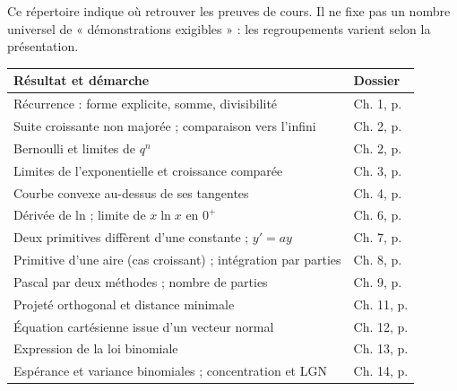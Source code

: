 Ce répertoire indique où retrouver les preuves de cours. Il ne fixe pas un nombre universel de « démonstrations exigibles » : les regroupements varient selon la présentation.
\begin{longtable}{@{}p{}p{}@{}}\toprule\textbf{Résultat et démarche}&\textbf{Dossier}\\\midrule\endhead
Récurrence : forme explicite, somme, divisibilité&Ch. 1, p. \pageref{ch:1}\\
Suite croissante non majorée ; comparaison vers l'infini&Ch. 2, p. \pageref{ch:2}\\
Bernoulli et limites de $q^n$&Ch. 2, p. \pageref{ch:2}\\
Limites de l'exponentielle et croissance comparée&Ch. 3, p. \pageref{ch:3}\\
Courbe convexe au-dessus de ses tangentes&Ch. 4, p. \pageref{ch:4}\\
Dérivée de ln ; limite de $x\ln x$ en $0^+$&Ch. 6, p. \pageref{ch:6}\\
Deux primitives diffèrent d'une constante ; $y'=ay$&Ch. 7, p. \pageref{ch:7}\\
Primitive d'une aire (cas croissant) ; intégration par parties&Ch. 8, p. \pageref{ch:8}\\
Pascal par deux méthodes ; nombre de parties&Ch. 9, p. \pageref{ch:9}\\
Projeté orthogonal et distance minimale&Ch. 11, p. \pageref{ch:11}\\
Équation cartésienne issue d'un vecteur normal&Ch. 12, p. \pageref{ch:12}\\
Expression de la loi binomiale&Ch. 13, p. \pageref{ch:13}\\
Espérance et variance binomiales ; concentration et LGN&Ch. 14, p. \pageref{ch:14}\\\bottomrule\end{longtable}
